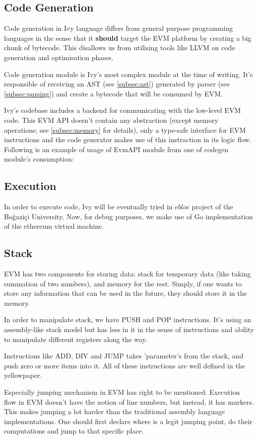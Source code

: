 \documentclass{article}
\begin{document}
\subsection{Code Generation}
\label{subsec:code_generation}
\par Code generation in Ivy language differs from general purpose programming languages in the sense that it \textbf{should} target the EVM platform by creating a big chunk of bytecode. This disallows us from utilising tools like LLVM\cite{llvm} on code generation and optimisation phases.
\par Code generation module is Ivy's most complex module at the time of writing. It's responsible of receiving an AST (see \ref{subsec:ast}) generated by parser (see \ref{subsec:parsing}) and create a bytecode that will be consumed by EVM.
\par Ivy's codebase includes a backend for communicating with the low-level EVM code. This EVM API doesn't contain any abstraction (except memory operations; see \ref{subsec:memory} for details), only a type-safe interface for EVM instructions and the code generator makes use of this instraction in its logic flow. Following is an example of usage of EvmAPI module from one of codegen module's consumption:
\newpage

\subsection{Execution}
\label{subsec:execution}
In order to execute code, Ivy will be eventually tried in $ebloc$ project of the Boğaziçi University. Now, for debug purposes, we make use of Go\cite{go} implementation of the ethereum virtual machine\cite{ethereum-go}.
\subsection{Stack}
\label{subsec:stack}
EVM has two components for storing data: stack for temporary data (like taking summation of two numbers), and memory for the rest. Simply, if one wants to store any information that can be used in the future, they should store it in the memory.
\par In order to manipulate stack, we have PUSH and POP instructions. It's using an assembly-like stack model but has less in it in the sense of instructions and ability to manipulate different registers along the way.
\par Instructions like ADD, DIV and JUMP takes 'parameter's from the stack, and push zero or more items into it. All of these instructions are well defined in the yellowpaper\cite{yellowpaper}.
\par Especially jumping mechanism in EVM has right to be mentioned. Execution flow in EVM doesn't have the notion of line numbers, but instead, it has markers. This makes jumping a lot harder than the traditional assembly language implementations. One should first declare where is a legit jumping point, do their computations and jump to that specific place.
\end{document}
